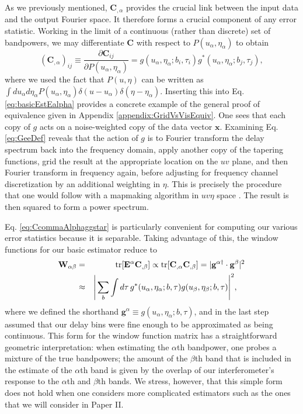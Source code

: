 \documentclass[twocolumn,aps,prd,nofootinbib,showpacs]{revtex4-1}
\begin{document}
As we previously mentioned, $\mathbf{C}_{,\alpha}$ provides the crucial link between the input data and the output Fourier space.  It therefore forms a crucial component of any error statistic.  Working in the limit of a continuous (rather than discrete) set of bandpowers, we may differentiate $\mathbf{C}$ with respect to $P(u_\alpha, \eta_\alpha)$ to obtain
\begin{equation}
\label{eq:CcommaAlphaggstar}
(\mathbf{C}_{,\alpha})_{ij} \equiv \frac{\partial \mathbf{C}_{ij}}{\partial P(u_\alpha, \eta_\alpha)} = g(u_\alpha, \eta_\alpha; b_i, \tau_i) g^* (u_\alpha, \eta_\alpha; b_j, \tau_j),
\end{equation}
where we used the fact that $P(u, \eta)$ can be written as $\int du_\alpha d\eta_\alpha P(u_\alpha, \eta_\alpha) \delta(u - u_\alpha) \delta (\eta - \eta_\alpha) $.  Inserting this into Eq. \eqref{eq:basicEstEalpha} provides a concrete example of the general proof of equivalence given in Appendix \ref{appendix:GridVsVisEquiv}.  One sees that each copy of $g$ acts on a noise-weighted copy of the data vector $\mathbf{x}$.  Examining Eq. \eqref{eq:GeeDef} reveals that the action of $g$ is to Fourier transform the delay spectrum back into the frequency domain, apply another copy of the tapering functions, grid the result at the appropriate location on the $uv$ plane, and then Fourier transform in frequency again, before adjusting for frequency channel discretization by an additional weighting in $\eta$.  This is precisely the procedure that one would follow with a mapmaking algorithm in $uv\eta$ space \cite{Morales2008}.  The result is then squared to form a power spectrum.

Eq. \eqref{eq:CcommaAlphaggstar} is particularly convenient for computing our various error statistics because it is separable.  Taking advantage of this, the window functions for our basic estimator reduce to
\begin{eqnarray}
\mathbf{W}_{\alpha \beta} &=& \textrm{tr} [ \mathbf{E}^\alpha \mathbf{C}_{,\beta} ] \propto  \textrm{tr} [\mathbf{C}_{,\alpha}  \mathbf{C}_{,\beta}] = | \mathbf{g}^{\alpha \dagger} \cdot \mathbf{g}^{\beta}|^2 \nonumber \\ 
& \approx & \Bigg{|} \sum_{b} \int d\tau \, g^*(u_\alpha, \eta_\alpha; b, \tau) g (u_\beta, \eta_\beta; b, \tau) \Bigg{|}^2,\quad \label{eq:simplifiedWind}
\end{eqnarray}
where we defined the shorthand $\mathbf{g}^\alpha \equiv g(u_\alpha, \eta_\alpha; b, \tau)$, and in the last step assumed that our delay bins were fine enough to be approximated as being continuous.  This form for the window function matrix has a straightforward geometric interpretation: when estimating the $\alpha$th bandpower, one probes a mixture of the true bandpowers; the amount of the $\beta$th band that is included in the estimate of the $\alpha$th band is given by the overlap of our interferometer's response to the $\alpha$th and $\beta$th bands.  We stress, however, that this simple form does not hold when one considers more complicated estimators such as the ones that we will consider in Paper II.
\end{document}
